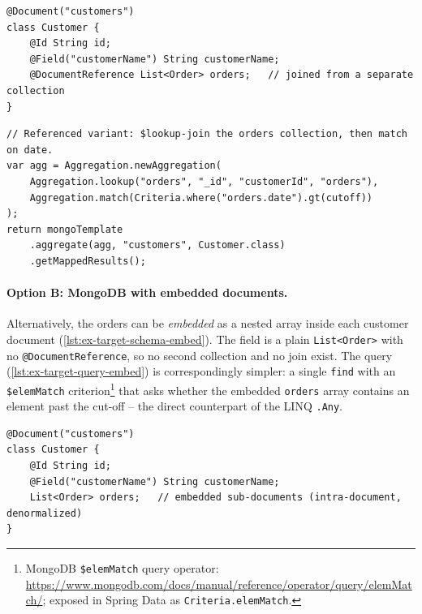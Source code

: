\begin{listing}[H]
\begin{verbatim}
@Document("customers")
class Customer {
    @Id String id;
    @Field("customerName") String customerName;
    @DocumentReference List<Order> orders;   // joined from a separate collection
}
\end{verbatim}
\caption{Target schema, option~A -- Spring Data MongoDB with the orders held as a \texttt{@DocumentReference} (inter-document, normalized).}
\label{lst:ex-target-schema}
\end{listing}

\begin{listing}[H]
\begin{verbatim}
// Referenced variant: $lookup-join the orders collection, then match on date.
var agg = Aggregation.newAggregation(
    Aggregation.lookup("orders", "_id", "customerId", "orders"),
    Aggregation.match(Criteria.where("orders.date").gt(cutoff))
);
return mongoTemplate
    .aggregate(agg, "customers", Customer.class)
    .getMappedResults();
\end{verbatim}
\caption{Target query, option~A -- the LINQ expression of \cref{lst:ex-source-query} as a MongoDB aggregation pipeline over referenced documents.}
\label{lst:ex-target-query}
\end{listing}

\paragraph{Option B: MongoDB with embedded documents.}
Alternatively, the orders can be \emph{embedded} as a nested array inside each customer document (\cref{lst:ex-target-schema-embed}). The field is a plain \texttt{List<Order>} with no \texttt{@DocumentReference}, so no second collection and no join exist. The query (\cref{lst:ex-target-query-embed}) is correspondingly simpler: a single \texttt{find} with an \texttt{\$elemMatch} criterion\footnote{MongoDB \texttt{\$elemMatch} query operator: \url{https://www.mongodb.com/docs/manual/reference/operator/query/elemMatch/}; exposed in Spring Data as \texttt{Criteria.elemMatch}.} that asks whether the embedded \texttt{orders} array contains an element past the cut-off -- the direct counterpart of the LINQ \texttt{.Any}.

\begin{listing}[H]
\begin{verbatim}
@Document("customers")
class Customer {
    @Id String id;
    @Field("customerName") String customerName;
    List<Order> orders;   // embedded sub-documents (intra-document, denormalized)
}
\end{verbatim}
\caption{Target schema, option~B -- Spring Data MongoDB with the orders \emph{embedded} as a nested array (intra-document).}
\label{lst:ex-target-schema-embed}
\end{listing}

